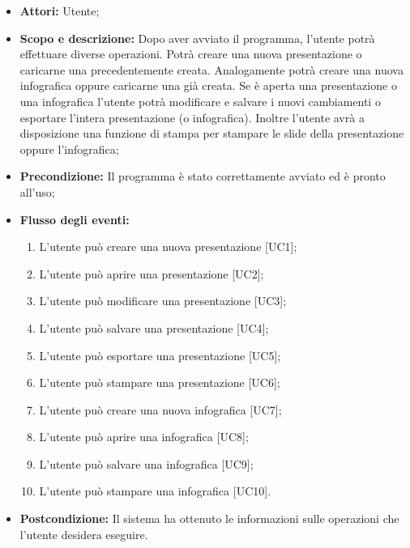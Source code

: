 \begin{itemize}
	\item \textbf{Attori:} Utente;
	\item \textbf{Scopo e descrizione:} Dopo aver avviato il programma, l'utente potrà effettuare diverse operazioni. Potrà creare una nuova presentazione o caricarne una precedentemente creata. Analogamente potrà creare una nuova infografica oppure caricarne una già creata. Se è aperta una presentazione o una infografica l'utente potrà modificare e salvare i nuovi cambiamenti o esportare l'intera presentazione (o infografica). Inoltre l'utente avrà a disposizione una funzione di stampa per stampare le slide della presentazione oppure l'infografica;
	\item \textbf{Precondizione:} Il programma è stato correttamente avviato ed è pronto all'uso;
	\item \textbf{Flusso degli eventi:}
	\begin{enumerate}
		\item L'utente può creare una nuova presentazione [UC1];
		\item L'utente può aprire una presentazione [UC2];
		\item L'utente può modificare una presentazione [UC3];
		\item L'utente può salvare una presentazione [UC4];
		\item L'utente può esportare una presentazione [UC5];
		\item L'utente può stampare una presentazione [UC6];
		\item L'utente può creare una nuova infografica [UC7];
		\item L'utente può aprire una infografica [UC8];
		\item L'utente può salvare una infografica [UC9];
		\item L'utente può stampare una infografica [UC10].
	\end{enumerate}
	\item \textbf{Postcondizione:} Il sistema ha ottenuto le informazioni sulle operazioni che l’utente desidera eseguire.
\end{itemize}









